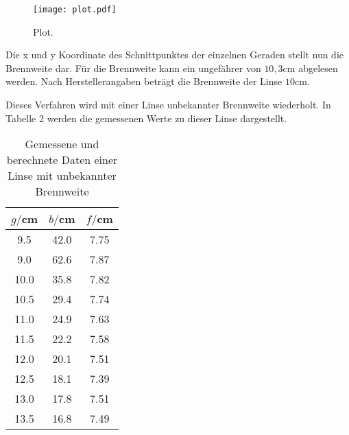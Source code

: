 \begin{figure}
  \centering
  \texttt{[image: plot.pdf]}
  \caption{Plot.}
  \label{fig:plot}
\end{figure}


Die x und y Koordinate des Schnittpunktes der einzelnen Geraden stellt nun die Brennweite dar. Für die Brennweite kann
ein ungefährer von $10,3$cm abgelesen werden. Nach Herstellerangaben beträgt die Brennweite der Linse $10$cm.



Dieses Verfahren wird mit einer Linse unbekannter Brennweite wiederholt. In Tabelle 2 werden
die gemessenen Werte zu dieser Linse dargestellt.

\begin{table}[H]
  \centering
  \caption{Gemessene und berechnete Daten einer Linse mit unbekannter Brennweite}
  \label{tab:Widerstand}
  \begin{tabular}{c c c}
    \toprule
    $g/$cm  & $b/$cm & $f/$cm \\
    \midrule
    9.5     &     42.0 & 7.75 \\
    9.0     &     62.6 & 7.87 \\
    10.0    &     35.8 & 7.82 \\
    10.5    &     29.4 & 7.74 \\
    11.0    &     24.9 & 7.63 \\
    11.5    &     22.2 & 7.58 \\
    12.0    &     20.1 & 7.51 \\
    12.5    &     18.1 & 7.39 \\
    13.0    &     17.8 & 7.51 \\
    13.5    &     16.8 & 7.49 \\
    \bottomrule
  \end{tabular}
\end{table}
